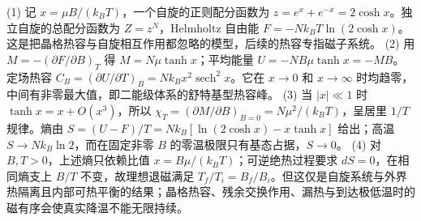 (1) 记 \(x=\mu B/(k_BT)\)，一个自旋的正则配分函数为 \(z=e^x+e^{-x}=2\cosh x\)。独立自旋的总配分函数为 \(Z=z^N\)，Helmholtz 自由能 \(F=-Nk_BT\ln(2\cosh x)\)。这是把晶格热容与自旋相互作用都忽略的模型，后续的热容专指磁子系统。
(2) 用 \(M=-(\partial F/\partial B)_T\) 得 \(M=N\mu\tanh x\)；平均能量 \(U=-NB\mu\tanh x=-MB\)。定场热容 \(C_B=(\partial U/\partial T)_B=Nk_Bx^2\operatorname{sech}^2x\)。它在 \(x\to0\) 和 \(x\to\infty\) 时均趋零，中间有非零最大值，即二能级体系的舒特基型热容峰。
(3) 当 \(|x|\ll1\) 时 \(\tanh x=x+O(x^3)\)，所以 \(\chi_T=(\partial M/\partial B)_{B=0}=N\mu^2/(k_BT)\)，呈居里 \(1/T\) 规律。熵由 \(S=(U-F)/T=Nk_B[\ln(2\cosh x)-x\tanh x]\) 给出；高温 \(S\to Nk_B\ln2\)，而在固定非零 \(B\) 的零温极限只有基态占据，\(S\to0\)。
(4) 对 \(B,T>0\)，上述熵只依赖比值 \(x=B\mu/(k_BT)\)；可逆绝热过程要求 \(dS=0\)，在相同熵支上 \(B/T\) 不变，故理想退磁满足 \(T_f/T_i=B_f/B_i\)。但这仅是自旋系统与外界热隔离且内部可热平衡的结果；晶格热容、残余交换作用、漏热与到达极低温时的磁有序会使真实降温不能无限持续。
